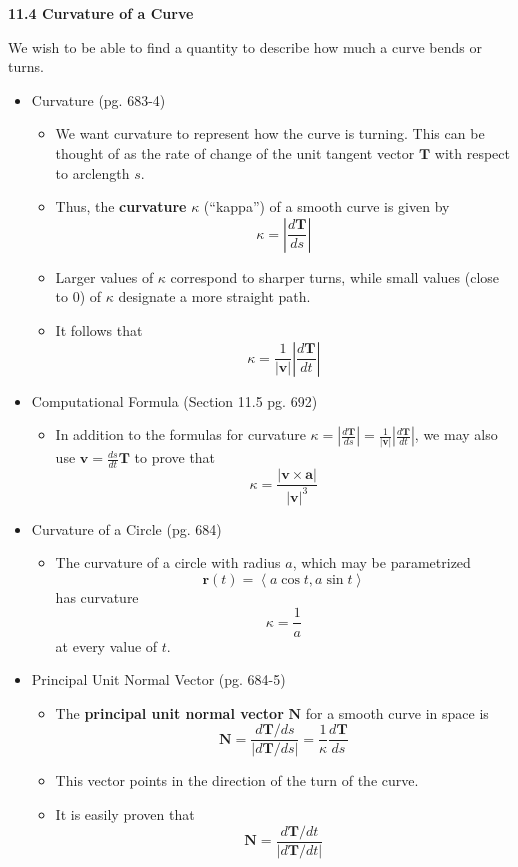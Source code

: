\documentclass[12pt]{article}
\renewcommand{\vec}[1]{\mathbf{#1}}
\newcommand{\<}{\left<}
\renewcommand{\>}{\right>}
\begin{document}
  \newpage
  
  \centerline{\bf 11.4 Curvature of a Curve}
  
  We wish to be able to find a quantity to describe how much a curve bends or turns.
  
  \begin{itemize}
  \item Curvature (pg. 683-4)
    \begin{itemize}
    \item We want curvature to represent how the curve is turning. This can be thought of as the rate of change of the unit tangent vector $\vec{T}$ with respect to arclength $s$.
    \item Thus, the \textbf{curvature} $\kappa$ (``kappa'') of a smooth curve is given by \[\kappa = \left|\frac{d\vec{T}}{ds}\right| \]
    \item Larger values of $\kappa$ correspond to sharper turns, while small values (close to $0$) of $\kappa$ designate a more straight path.
    \item It follows that \[\kappa = \frac{1}{|\vec{v}|}\left|\frac{d\vec{T}}{dt}\right|\]
    \end{itemize}
    
  \item Computational Formula (Section 11.5 pg. 692)
  
    \begin{itemize}
    \item In addition to the formulas for curvature $\kappa = \left|\frac{d\vec{T}}{ds}\right| = \frac{1}{|\vec{v}|}\left|\frac{d\vec{T}}{dt}\right|$, we may also  use $\vec{v}=\frac{ds}{dt}\vec{T}$ to prove that \[\kappa = \frac{|\vec{v} \times \vec{a}|}{|\vec{v}|^3}\]
    \end{itemize}
  
  \item Curvature of a Circle (pg. 684)
  
    \begin{itemize}
    \item The curvature of a circle with radius $a$, which may be parametrized \[\vec{r}(t)=\<a\cos t,a\sin t\>\] has curvature \[\kappa = \frac{1}{a}\] at every value of $t$.
    \end{itemize}
    
    \newpage
  
  \item Principal Unit Normal Vector (pg. 684-5)
    \begin{itemize}
    \item The \textbf{principal unit normal vector} $\vec{N}$ for a smooth curve in space is \[\vec{N} = \frac{d\vec{T}/ds}{|d\vec{T}/ds|}= \frac{1}{\kappa} \frac{d\vec{T}}{ds}\]
    \item This vector points in the direction of the turn of the curve.
    \item It is easily proven that \[\vec{N} = \frac{d\vec{T}/dt}{|d\vec{T}/dt|}\]
    \end{itemize}
  

\end{itemize}
\end{document}
